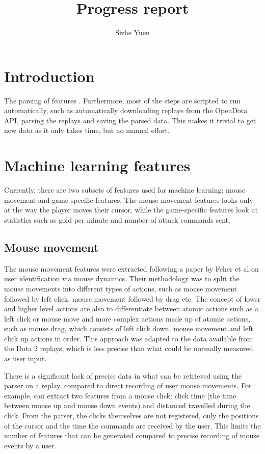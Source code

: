 \documentclass{../sty/SizheArticle}
\title{Progress report}
\author{Sizhe Yuen}
\begin{document}

\section{Introduction}
The parsing of features . Furthermore, most of the steps are scripted to run automatically, such as automatically downloading replays from the OpenDota API, parsing the replays and saving the parsed data. This makes it trivial to get new data as it only takes time, but no manual effort. 

\section{Machine learning features}
Currently, there are two subsets of features used for machine learning: mouse movement and game-specific features. The mouse movement features looks only at the way the player moves their cursor, while the game-specific features look at statistics such as gold per minute and number of attack commands sent. 

\subsection{Mouse movement}
The mouse movement features were extracted following a paper by Feher et al \cite{mouse-dynamics} on user identification via mouse dynamics. Their methodology was to split the mouse movements into different types of actions, such as mouse movement followed by left click, mouse movement followed by drag etc. The concept of lower and higher level actions are also to differentiate between atomic actions such as a left click or mouse move and more complex actions made up of atomic actions, such as mouse drag, which consists of left click down, mouse movement and left click up actions in order. This approach was adapted to the data available from the Dota 2 replays, which is less precise than what could be normally measured as user input. 

There is a significant lack of precise data in what can be retrieved using the parser on a replay, compared to direct recording of user mouse movements. For example, \cite{mouse-dynamics} can extract two features from a mouse click: click time (the time between mouse up and mouse down events) and distanced travelled during the click. From the parser, the clicks themselves are not registered, only the positions of the cursor and the time the commands are received by the user. This limits the number of features that can be generated compared to precise recording of mouse events by a user. 
\end{document}
